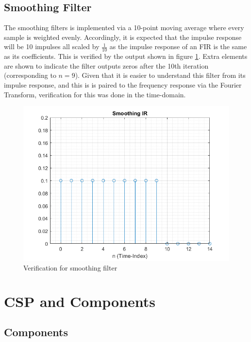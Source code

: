\documentclass[../main.tex]{subfiles}
\begin{document}
\subsection{Smoothing Filter}
The smoothing filters is implemented via a 10-point moving average where every sample is weighted evenly. Accordingly, it is expected that the impulse response will be 10 impulses all scaled by $\frac{1}{10}$ as the impulse response of an FIR is the same as its coefficients. This is verified by the output shown in figure \ref{fig:SmoothingIR}. Extra elements are shown to indicate the filter outputs zeros after the 10th iteration (corresponding to $n = 9$). Given that it is easier to understand this filter from its impulse response, and this is is paired to the frequency response via the Fourier Transform, verification for this was done in the time-domain.

\begin{figure}[h]
    \centering
    \includegraphics[scale=.65]{./images/plots/SmoothingIR.png}
    \caption{Verification for smoothing filter}
    \label{fig:SmoothingIR}
\end{figure}

\section{CSP and Components}
\subsection{Components}
\end{document}
